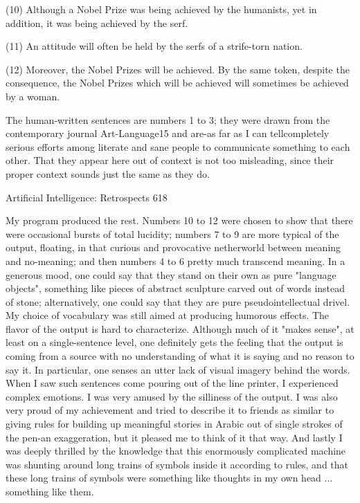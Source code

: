 {   (10) Although a Nobel Prize was being achieved by the humanists, yet in addition,
      it was being achieved by the serf.

   (11) An attitude will often be held by the serfs of a strife-torn nation.

   (12) Moreover, the Nobel Prizes will be achieved. By the same token, despite the
      consequence, the Nobel Prizes which will be achieved will sometimes be
      achieved by a woman.

The human-written sentences are numbers 1 to 3; they were drawn from the
contemporary journal Art-Language15 and are-as far as I can tellcompletely serious
efforts among literate and sane people to communicate something to each other. That
they appear here out of context is not too misleading, since their proper context sounds
just the same as they do.

Artificial Intelligence: Retrospects                                                   618

        My program produced the rest. Numbers 10 to 12 were chosen to show that there
were occasional bursts of total lucidity; numbers 7 to 9 are more typical of the output,
floating, in that curious and provocative netherworld between meaning and no-meaning;
and then numbers 4 to 6 pretty much transcend meaning. In a generous mood, one could
say that they stand on their own as pure "language objects", something like pieces of
abstract sculpture carved out of words instead of stone; alternatively, one could say that
they are pure pseudointellectual drivel.
        My choice of vocabulary was still aimed at producing humorous effects. The
flavor of the output is hard to characterize. Although much of it "makes sense", at least
on a single-sentence level, one definitely gets the feeling that the output is coming from a
source with no understanding of what it is saying and no reason to say it. In particular,
one senses an utter lack of visual imagery behind the words. When I saw such sentences
come pouring out of the line printer, I experienced complex emotions. I was very amused
by the silliness of the output. I was also very proud of my achievement and tried to
describe it to friends as similar to giving rules for building up meaningful stories in
Arabic out of single strokes of the pen-an exaggeration, but it pleased me to think of it
that way. And lastly I was deeply thrilled by the knowledge that this enormously
complicated machine was shunting around long trains of symbols inside it according to
rules, and that these long trains of symbols were something like thoughts in my own head
... something like them.

}
